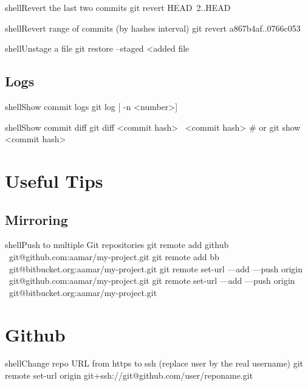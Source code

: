 \documentclass[10pt,a4paper]{article}
\begin{document}
\begin{multicols}{3}
\begin{codebox}{shell}{Revert the last two commits}
git revert HEAD~2..HEAD

\end{codebox}

\begin{codebox}{shell}{Revert range of commits (by hashes interval)}
git revert a867b4af..0766c053

\end{codebox}

\begin{codebox}{shell}{Unstage a file}
git restore --staged <added file

\end{codebox}

\subsection{Logs}

\begin{codebox}{shell}{Show commit logs}
git log [ -n <number>]

\end{codebox}

\begin{codebox}{shell}{Show commit diff}
git diff <commit hash>~   <commit hash>
# or 
 git show <commit hash>

\end{codebox}

\section{Useful Tips}

\subsection{Mirroring}

\begin{codebox}{shell}{Push to multiple Git repositories}
git remote add github \
      git@github.com:aamar/my-project.git 
git remote add bb \ 
      git@bitbucket.org:aamar/my-project.git 
git remote set-url ---add ---push origin \
      git@github.com:aamar/my-project.git
git remote set-url ---add ---push origin \
      git@bitbucket.org:aamar/my-project.git

\end{codebox}

\section{Github}

\begin{codebox}{shell}{Change repo URL from https to ssh (replace user by the real username)}
git remote set-url origin git+ssh://git@github.com/user/reponame.git

\end{codebox}


\AtNextBibliography{\footnotesize}
\printbibliography  
\end{multicols}
\end{document}
